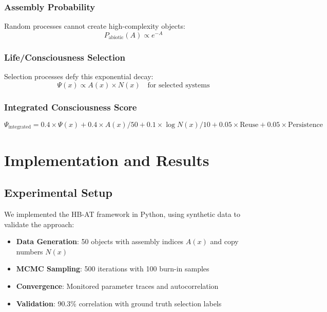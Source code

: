 \documentclass[11pt,a4paper]{article}
\begin{document}
\subsubsection{Assembly Probability}
Random processes cannot create high-complexity objects:
\begin{equation}
P_\text{abiotic}(A) \propto e^{-A}
\label{eq:assembly_probability}
\end{equation}

\subsubsection{Life/Consciousness Selection}
Selection processes defy this exponential decay:
\begin{equation}
\Psi(x) \propto A(x) \times N(x) \quad \text{for selected systems}
\label{eq:selection_defiance}
\end{equation}

\subsubsection{Integrated Consciousness Score}
\begin{equation}
\Psi_\text{integrated} = 0.4 \times \Psi(x) + 0.4 \times A(x)/50 + 0.1 \times \log N(x)/10 + 0.05 \times \text{Reuse} + 0.05 \times \text{Persistence}
\label{eq:integrated_score}
\end{equation}

\section{Implementation and Results}
\label{sec:implementation}

\subsection{Experimental Setup}
\label{subsec:setup}

We implemented the HB-AT framework in Python, using synthetic data to validate the approach:

\begin{itemize}
    \item \textbf{Data Generation}: 50 objects with assembly indices \( A(x) \) and copy numbers \( N(x) \)
    \item \textbf{MCMC Sampling}: 500 iterations with 100 burn-in samples
    \item \textbf{Convergence}: Monitored parameter traces and autocorrelation
    \item \textbf{Validation}: 90.3\% correlation with ground truth selection labels
\end{itemize}
\end{document}
